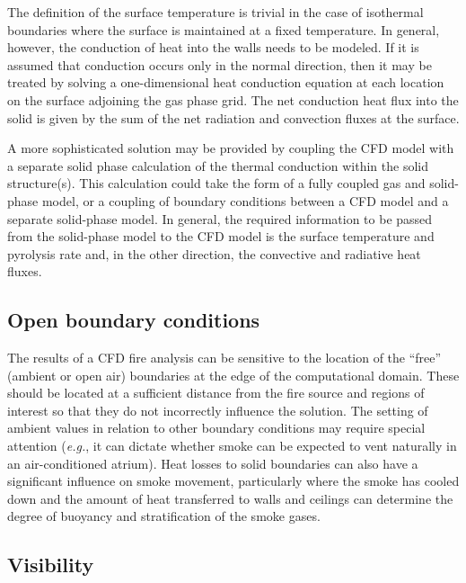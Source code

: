 \documentclass[graybox]{svmult}
\begin{document}
The definition of the surface temperature is trivial in the case of isothermal boundaries where the surface is maintained at a fixed temperature. In general, however, the conduction of heat into the walls needs to be modeled. If it is assumed that conduction occurs only in the normal direction, then it may be treated by solving a one-dimensional heat conduction equation at each location on the surface adjoining the gas phase grid. The net conduction heat flux into the solid is given by the sum of the net radiation and convection fluxes at the surface.

A more sophisticated solution may be provided by coupling the CFD model with a separate solid phase calculation of the thermal conduction within the solid structure(s). This calculation could take the form of a fully coupled gas and solid-phase model, or a coupling of boundary conditions between a CFD model and a separate solid-phase model. In general, the required information to be passed from the solid-phase model to the CFD model is the surface temperature and pyrolysis rate and, in the other direction, the convective and radiative heat fluxes.

\subsection{Open boundary conditions}

The results of a CFD fire analysis can be sensitive to the location of the ``free'' (ambient or open air) boundaries at the edge of the computational domain. These should be located at a sufficient distance from the fire source and regions of interest so that they do not incorrectly influence the solution. The setting of ambient values in relation to other boundary conditions may require special attention ({\em e.g.}, it can dictate whether smoke can be expected to vent naturally in an air-conditioned atrium). Heat losses to solid boundaries can also have a significant influence on smoke movement, particularly where the smoke has cooled down and the amount of heat transferred to walls and ceilings can determine the degree of buoyancy and stratification of the smoke gases.



\subsection{Visibility}
\end{document}
